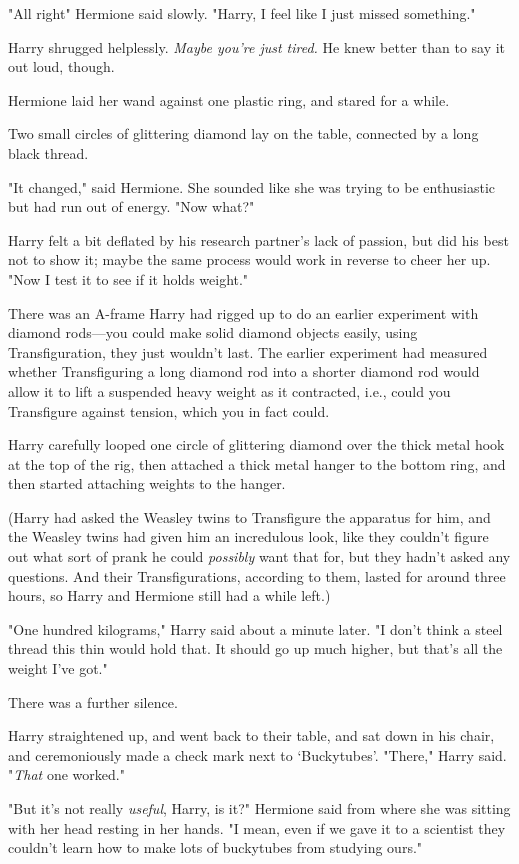 "All right{\el}" Hermione said slowly. "Harry, I feel like I just missed
something."

Harry shrugged helplessly. \emph{Maybe you're just tired.} He knew better than
to say it out loud, though.

Hermione laid her wand against one plastic ring, and stared for a while.

Two small circles of glittering diamond lay on the table, connected by a long
black thread.

"It changed," said Hermione. She sounded like she was trying to be enthusiastic
but had run out of energy. "Now what?"

Harry felt a bit deflated by his research partner's lack of passion, but did
his best not to show it; maybe the same process would work in reverse to cheer
her up. "Now I test it to see if it holds weight."

There was an A-frame Harry had rigged up to do an earlier experiment with
diamond rods---you could make solid diamond objects easily, using
Transfiguration, they just wouldn't last. The earlier experiment had measured
whether Transfiguring a long diamond rod into a shorter diamond rod would allow
it to lift a suspended heavy weight as it contracted, i.e., could you
Transfigure against tension, which you in fact could.

Harry carefully looped one circle of glittering diamond over the thick metal
hook at the top of the rig, then attached a thick metal hanger to the bottom
ring, and then started attaching weights to the hanger.

(Harry had asked the Weasley twins to Transfigure the apparatus for him, and
the Weasley twins had given him an incredulous look, like they couldn't figure
out what sort of prank he could \emph{possibly} want that for, but they hadn't
asked any questions. And their Transfigurations, according to them, lasted for
around three hours, so Harry and Hermione still had a while left.)

"One hundred kilograms," Harry said about a minute later. "I don't think a
steel thread this thin would hold that. It should go up much higher, but that's
all the weight I've got."

There was a further silence.

Harry straightened up, and went back to their table, and sat down in his chair,
and ceremoniously made a check mark next to `Buckytubes'. "There," Harry said.
"\emph{That} one worked."

"But it's not really \emph{useful}, Harry, is it?" Hermione said from where she
was sitting with her head resting in her hands. "I mean, even if we gave it to
a scientist they couldn't learn how to make lots of buckytubes from studying
ours."


